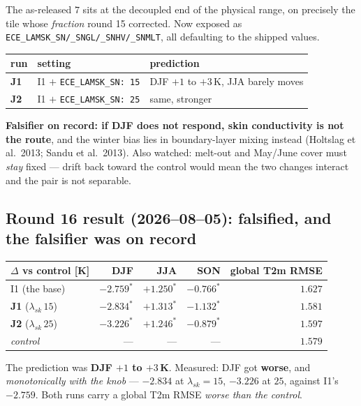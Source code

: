 \documentclass[10pt]{article}
\begin{document}
\noindent The as-released $7$ sits at the decoupled end of the physical range, on precisely
the tile whose \emph{fraction} round 15 corrected. Now exposed as
\texttt{ECE\_LAMSK\_SN/\_SNGL/\_SNHV/\_SNMLT}, all defaulting to the shipped values.

\begin{center}\footnotesize
\begin{tabular}{l l l}
\toprule
run & setting & prediction \\
\midrule
\textbf{J1} & I1 $+$ \texttt{ECE\_LAMSK\_SN: 15} & DJF $+1$ to $+3$\,K, JJA barely moves \\
\textbf{J2} & I1 $+$ \texttt{ECE\_LAMSK\_SN: 25} & same, stronger \\
\bottomrule
\end{tabular}
\end{center}

\noindent \textbf{Falsifier on record: if DJF does not respond, skin conductivity is not the
route}, and the winter bias lies in boundary-layer mixing instead (Holtslag et al.\ 2013;
Sandu et al.\ 2013). Also watched: melt-out and May/June cover must \emph{stay} fixed --- drift
back toward the control would mean the two changes interact and the pair is not separable.

\subsection{Round 16 result (2026--08--05): falsified, and the falsifier was on record}\label{sub:r16res}
\begin{center}\footnotesize
\begin{tabular}{l r r r r}
\toprule
$\Delta$ vs control [K] & DJF & JJA & SON & global T2m RMSE \\
\midrule
I1 (the base) & $-2.759^*$ & $+1.250^*$ & $-0.766^*$ & $1.627$ \\
\textbf{J1} ($\lambda_{sk}\,15$) & $\mathbf{-2.834^*}$ & $+1.313^*$ & $-1.132^*$ & $1.581$ \\
\textbf{J2} ($\lambda_{sk}\,25$) & $\mathbf{-3.226^*}$ & $+1.246^*$ & $-0.879^*$ & $1.597$ \\
\emph{control} & --- & --- & --- & $1.579$ \\
\bottomrule
\end{tabular}
\end{center}

\noindent The prediction was \textbf{DJF $+1$ to $+3$\,K}. Measured: DJF got \textbf{worse},
and \emph{monotonically with the knob} --- $-2.834$ at $\lambda_{sk}{=}15$, $-3.226$ at $25$,
against I1's $-2.759$. Both runs carry a global T2m RMSE \emph{worse than the control}.
\end{document}
